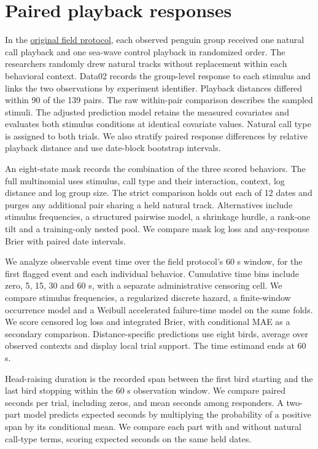 \documentclass[11pt,a4paper]{article}
\begin{document}
\PropagationResults

\clearpage
\section{Paired playback responses}
In the \href{https://doi.org/10.12688/openreseurope.24618.1}{original field protocol}, each observed penguin group received one natural call playback and one sea-wave control playback in randomized order. The researchers randomly drew natural tracks without replacement within each behavioral context. Data02 records the group-level response to each stimulus and links the two observations by experiment identifier. Playback distances differed within 90 of the 139 pairs. The raw within-pair comparison describes the sampled stimuli. The adjusted prediction model retains the measured covariates and evaluates both stimulus conditions at identical covariate values. Natural call type is assigned to both trials. We also stratify paired response differences by relative playback distance and use date-block bootstrap intervals.

An eight-state mask records the combination of the three scored behaviors. The full multinomial uses stimulus, call type and their interaction, context, log distance and log group size. The strict comparison holds out each of 12 dates and purges any additional pair sharing a held natural track. Alternatives include stimulus frequencies, a structured pairwise model, a shrinkage hurdle, a rank-one tilt and a training-only nested pool. We compare mask log loss and any-response Brier with paired date intervals.

We analyze observable event time over the field protocol's 60 s window, for the first flagged event and each individual behavior. Cumulative time bins include zero, 5, 15, 30 and 60 s, with a separate administrative censoring cell. We compare stimulus frequencies, a regularized discrete hazard, a finite-window occurrence model and a Weibull accelerated failure-time model on the same folds. We score censored log loss and integrated Brier, with conditional MAE as a secondary comparison. Distance-specific predictions use eight birds, average over observed contexts and display local trial support. The time estimand ends at 60 s.

Head-raising duration is the recorded span between the first bird starting and the last bird stopping within the 60 s observation window. We compare paired seconds per trial, including zeros, and mean seconds among responders. A two-part model predicts expected seconds by multiplying the probability of a positive span by its conditional mean. We compare each part with and without natural call-type terms, scoring expected seconds on the same held dates.
\end{document}
